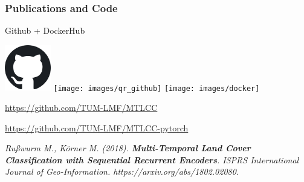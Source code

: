 \documentclass[%
  aspectratio=169,
  9pt,
ngerman,
  light,
  mathserif,
  professionalfont,
  affiliationintitlepagehead,
  titlegraphic,
   affiliation,
   navigationbar,
  progressbar,
]{beamer}
\begin{document}
\begin{frame}[c]
\frametitle{Publications and Code}
\centering 

\Large



Github + DockerHub

\vspace{1ex}

\includegraphics[width=2cm]{images/github} \hspace{.5ex}
\texttt{[image: images/qr\_github]} \hspace{.5ex}
\texttt{[image: images/docker]}

\vspace{1ex}

\url{https://github.com/TUM-LMF/MTLCC}

\url{https://github.com/TUM-LMF/MTLCC-pytorch}

\vspace{1em}
\small
\textsl{
	Rußwurm M., Körner M. (2018). \textbf{Multi-Temporal Land Cover Classification with Sequential Recurrent Encoders}. ISPRS International Journal of Geo-Information. https://arxiv.org/abs/1802.02080.
}
	
\end{frame}
\end{document}
